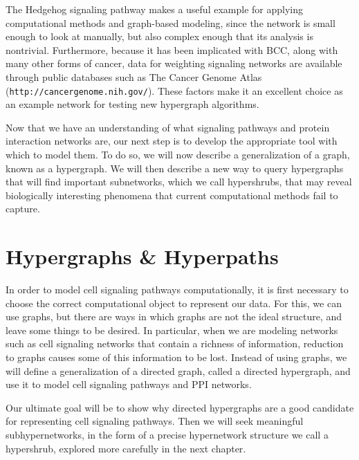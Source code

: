 \documentclass[12pt,twoside]{reedthesis}
\theoremstyle{definition}
\begin{document}
The Hedgehog signaling pathway makes a useful example for applying computational methods and graph-based modeling, since the network is small enough to look at manually, but also complex enough that its analysis is nontrivial. Furthermore, because it has been implicated with BCC, along with many other forms of cancer, data for weighting signaling networks are available through public databases such as The Cancer Genome Atlas (\texttt{http://cancergenome.nih.gov/}). These factors make it an excellent choice as an example network for testing new hypergraph algorithms.\par

Now that we have an understanding of what signaling pathways and protein interaction networks are, our next step is to develop the appropriate tool with which to model them. To do so, we will now describe a generalization of a graph, known as a hypergraph. We will then describe a new way to query hypergraphs that will find important subnetworks, which we call hypershrubs, that may reveal biologically interesting phenomena that current computational methods fail to capture.\par

\chapter{Hypergraphs \& Hyperpaths}

In order to model cell signaling pathways computationally, it is first necessary to choose the correct computational object to represent our data. For this, we can use graphs, but there are ways in which graphs are not the ideal structure, and leave some things to be desired. In particular, when we are modeling networks such as cell signaling networks that contain a richness of information, reduction to graphs causes some of this information to be lost. Instead of using graphs, we will define a generalization of a directed graph, called a directed hypergraph, and use it to model cell signaling pathways and PPI networks.\par

Our ultimate goal will be to show why directed hypergraphs are a good candidate for representing cell signaling pathways. Then we will seek meaningful subhypernetworks, in the form of a precise hypernetwork structure we call a hypershrub, explored more carefully in the next chapter.
\end{document}
